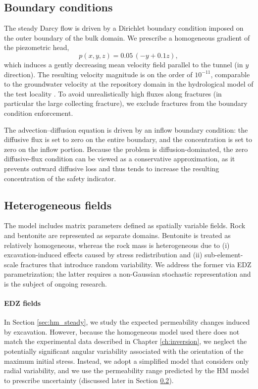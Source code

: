 \subsection{Boundary conditions}
The steady Darcy flow is driven by a Dirichlet boundary condition imposed on the outer boundary of the bulk domain. We prescribe a homogeneous gradient of the piezometric head,
\[
p(x,y,z) = 0.05\,(-y + 0.1z),
\]
which induces a gently decreasing mean velocity field parallel to the tunnel
(in $y$  direction). The resulting velocity magnitude is on the order of $10^{-11}$, comparable to the groundwater velocity at the repository domain in the hydrological model of the test locality . To avoid unrealistically high fluxes along fractures (in particular the large collecting fracture), we exclude fractures from the boundary condition enforcement.

The advection--diffusion equation is driven by an inflow boundary condition: the diffusive flux is set to zero on the entire boundary, and the concentration is set to zero on the inflow portion. Because the problem is diffusion-dominated, the zero diffusive-flux condition can be viewed as a conservative approximation, as it prevents outward diffusive loss and thus tends to increase the resulting concentration of the safety indicator.


\subsection{Heterogeneous fields}
\label{sec:parameters}

The model includes matrix parameters defined as spatially variable fields. Rock and bentonite are represented as separate domains. Bentonite is treated as relatively homogeneous, whereas the rock mass is heterogeneous due to (i) excavation-induced effects caused by stress redistribution and (ii) sub-element-scale fractures that introduce random variability. We address the former via \gls{EDZ} parametrization; the latter requires a non-Gaussian stochastic representation and is the subject of ongoing research.

\def\edzRelThick{{\color{red}\tilde{w}_e}}
\def\edzPerm{{\color{red}\tilde{k}_e}}
\def\iPerm{{\color{blue}k_r}}
\def\edzPor{{\color{red}\tilde{\theta}_e}}
\def\iPor{{\color{blue}\theta_r}}

\paragraph{EDZ fields}
In Section \ref{sec:hm_steady}, we study the expected permeability changes induced by excavation. However, because the homogeneous model used there does not match the experimental data described in Chapter \ref{ch:inversion}, we neglect the potentially significant angular variability associated with the orientation of the maximum initial stress. Instead, we adopt a simplified model that considers only radial variability, and we use the permeability range predicted by the HM model to prescribe uncertainty (discussed later in Section \ref{sec:parameters}).


